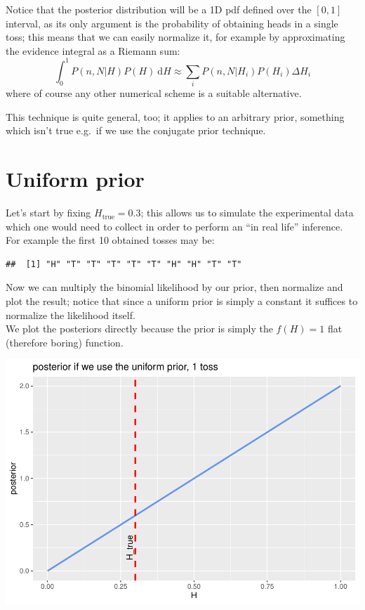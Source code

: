 \documentclass[
]{article}
\begin{document}
Notice that the posterior distribution will be a 1D pdf defined over the
\([0,1]\) interval, as its only argument is the probability of obtaining
heads in a single toss; this means that we can easily normalize it, for
example by approximating the evidence integral as a Riemann sum:
\begin{equation}
  \int_0^1 P(n,N|H)P(H) \ \mathrm{d}H \approx \sum_i P(n,N|H_i)P(H_i) \Delta H_i
\end{equation} where of course any other numerical scheme is a suitable
alternative.

This technique is quite general, too; it applies to an arbitrary prior,
something which isn't true e.g.~if we use the conjugate prior technique.

\hypertarget{uniform-prior}{%
\section{Uniform prior}\label{uniform-prior}}

Let's start by fixing \(H_{\text{true}} = 0.3\); this allows us to
simulate the experimental data which one would need to collect in order
to perform an ``in real life'' inference.\\
For example the first 10 obtained tosses may be:

\begin{verbatim}
##  [1] "H" "T" "T" "T" "T" "T" "H" "H" "T" "T"
\end{verbatim}

Now we can multiply the binomial likelihood by our prior, then normalize
and plot the result; notice that since a uniform prior is simply a
constant it suffices to normalize the likelihood itself.\\
We plot the posteriors directly because the prior is simply the
\(f(H) = 1\) flat (therefore boring) function.

\begin{center}\includegraphics[width=0.75\linewidth]{astrostat-1_files/figure-latex/unnamed-chunk-3-1} \end{center}
\end{document}

